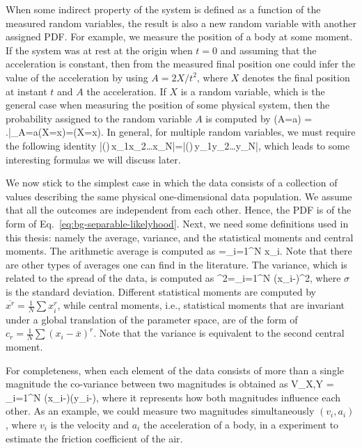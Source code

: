 When some indirect property of the system is defined as a function of the measured random variables, the result is also a new random variable with another assigned PDF.
For example, we measure the position of a body at some moment.
If the system was at rest at the origin when $t=0$ and assuming that the acceleration is constant, then from the measured final position one could infer the value of the acceleration by using $A=2X/t^2$, where $X$ denotes the final position at instant $t$ and $A$ the acceleration.
If $X$ is a random variable, which is the general case when measuring the position of some physical system, then the probability assigned to the random variable $A$ is computed by
\be
  \prob(A{=}a) = \left.\right|_{A=a}\prob(X{=}x)=\prob(X{=}x).
\ee
In general, for multiple random variables, we must require the following identity
\be
  |\prob()\,x_1x_2\dots{}x_N|=|\prob()\,y_1y_2\dots{}y_N|,
\ee
which leads to some interesting formulas we will discuss later.

We now stick to the simplest case in which the data consists of a collection of values describing the same physical one-dimensional data population.
We assume that all the outcomes are independent from each other.
Hence, the PDF is of the form of Eq.~\eqref{eq:bg-separable-likelyhood}.
Next, we need some definitions used in this thesis: namely the average, variance, and the statistical moments and central moments.
The arithmetic average  is computed as
\be
  =\sum_{i=1}^N x_i.
\ee
Note that there are other types of averages one can find in the literature.
The variance, which is related to the spread of the data, is computed as
\be
  \sigma^2=\sum_{i=1}^N (x_i-)^2,
\ee
where $\sigma$ is the standard deviation.
Different statistical moments are computed by $\overline{x^r}=\frac{1}{N}\sum x_i^r$, while central moments, i.e., statistical moments that are invariant under a global translation of the parameter space, are of the form of $c_r=\frac{1}{N}\sum (x_i-\overline{x})^r$.
Note that the variance is equivalent to the second central moment.

For completeness, when each element of the data consists of more than a single magnitude the co-variance between two magnitudes is obtained as
\be
  V_{X,Y} = \sum_{i=1}^N (x_i-)(y_i-),
\ee
where it represents how both magnitudes influence each other.
As an example, we could measure two magnitudes simultaneously $(v_i,a_i)$, where $v_i$ is the velocity and $a_i$ the acceleration of a body, in a experiment to estimate the friction coefficient of the air.

